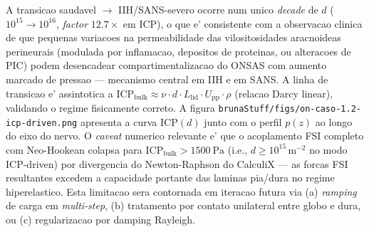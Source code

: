 A transicao saudavel $\rightarrow$ IIH/SANS-severo ocorre num unico \emph{decade} de $d$ ($10^{15} \rightarrow 10^{16}$, \emph{factor} $12.7\times$ em ICP), o que e' consistente com a observacao clinica de que pequenas variacoes na permeabilidade das vilositosidades aracnoideas perineurais (modulada por inflamacao, depositos de proteinas, ou alteracoes de PIC) podem desencadear compartimentalizacao do ONSAS com aumento marcado de pressao --- mecanismo central em IIH e em SANS. A linha de transicao e' assintotica a $\mathrm{ICP_{bulk}} \approx \nu \cdot d \cdot L_{\mathrm{lid}} \cdot U_{\mathrm{pp}} \cdot \rho$ (relacao Darcy linear), validando o regime fisicamente correto. A figura \texttt{brunaStuff/figs/on-caso-1.2-icp-driven.png} apresenta a curva $\mathrm{ICP}(d)$ junto com o perfil $p(z)$ ao longo do eixo do nervo. O \emph{caveat} numerico relevante e' que o acoplamento FSI completo com Neo-Hookean colapsa para $\mathrm{ICP_{bulk}} > \SI{1500}{\pascal}$ (i.e., $d \ge 10^{15}\,\si{\meter^{-2}}$ no modo ICP-driven) por divergencia do Newton-Raphson do CalculiX --- as forcas FSI resultantes excedem a capacidade portante das laminas pia/dura no regime hiperelastico. Esta limitacao sera contornada em iteracao futura via (a) \emph{ramping} de carga em \emph{multi-step}, (b) tratamento por contato unilateral entre globo e dura, ou (c) regularizacao por damping Rayleigh.

